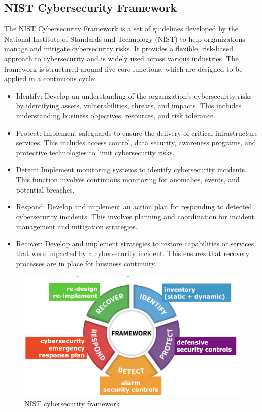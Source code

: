 \subsection{NIST Cybersecurity Framework}
The NIST Cybersecurity Framework is a set of guidelines developed by the National Institute of Standards and Technology (NIST) to help organizations manage and mitigate cybersecurity risks. It provides a flexible, risk-based approach to cybersecurity and is widely used across various industries. The framework is structured around five core functions, which are designed to be applied in a continuous cycle:
\begin{itemize}
    \item Identify: Develop an understanding of the organization’s cybersecurity risks by identifying assets, vulnerabilities, threats, and impacts. This includes understanding business objectives, resources, and risk tolerance.
    \item Protect: Implement safeguards to ensure the delivery of critical infrastructure services. This includes access control, data security, awareness programs, and protective technologies to limit cybersecurity risks.
    \item Detect: Implement monitoring systems to identify cybersecurity incidents. This function involves continuous monitoring for anomalies, events, and potential breaches.
    \item Respond: Develop and implement an action plan for responding to detected cybersecurity incidents. This involves planning and coordination for incident management and mitigation strategies.
    \item Recover: Develop and implement strategies to restore capabilities or services that were impacted by a cybersecurity incident. This ensures that recovery processes are in place for business continuity.
\end{itemize}

\begin{figure}[H]
    \includegraphics[width=\linewidth]{Images/Introduction/nistFramework.png}
    \caption{NIST cybersecurity framework}
\end{figure}